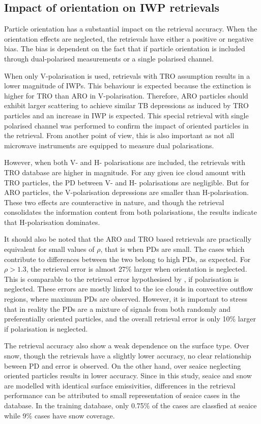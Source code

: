 \documentclass[amt, manuscript]{copernicus}
\begin{document}
\subsection{Impact of orientation on IWP retrievals}
%
Particle orientation has a substantial impact on the retrieval accuracy. When the orientation effects are neglected, the retrievals have either a  positive or negative bias. The bias is dependent on the fact that if particle orientation is included through dual-polarised measurements or a single polarised channel. 

When only V-polarisation is used, retrievals with TRO assumption results in a lower magnitude of IWPs. This behaviour is expected because the extinction is higher for TRO than ARO in V-polarisation. Therefore, ARO particles should exhibit larger scattering to achieve similar TB depressions as induced by TRO particles and an increase in IWP is expected. This special retrieval with single polarised channel was performed to confirm the impact of oriented particles in the retrieval. From another point of view, this is also important as not all microwave instruments are equipped to measure dual polarisations.

However, when both V- and H- polarisations are included, the retrievals with TRO database are higher in magnitude. For any given ice cloud amount with TRO particles, the PD between V- and H- polarisations are negligible. But for ARO particles, the V-polarisation depressions are smaller than H-polarisation. These two effects are counteractive in nature, and though the retrieval consolidates the information content from both polarisations, the results indicate that H-polarisation dominates.

It should also be noted that the ARO and TRO based retrievals are practically equivalent for small values of $\rho$, that is when PDs are small. The cases which contribute to differences between the two belong to high PDs, as expected. For $\rho > 1.3$, the retrieval error is almost 27\% larger when orientation is neglected. This is comparable to the retrieval error hypothesised by \citet{gong:micro:17}, if polarisation is neglected. These errors are mostly linked to the ice clouds in convective outflow regions, where maximum PDs are observed. However, it is important to stress  that in reality the PDs are a mixture of signals from both randomly and preferentially oriented particles, and the overall retrieval error is only 10\% larger if polarisation is neglected. 

The retrieval accuracy also show a weak dependence on the surface type. Over snow, though the retrievals have a slightly lower accuracy, no clear relationship beween PD and error is observed. On the other hand, over seaice neglecting oriented particles results in lower accuracy. Since in this study, seaice and snow are modelled with identical surface emissivities, differences in the retrieval performance can be attributed to small representation of seaice cases in the database. In the training database, only 0.75\% of the cases are classfied at seaice while 9\% cases have snow coverage.
\end{document}
